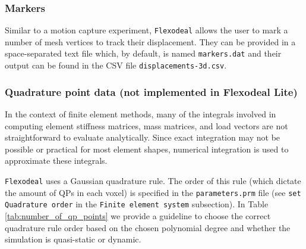 \documentclass{sfuthesis}
\numberwithin{equation}{section}
\numberwithin{figure}{chapter}
\numberwithin{table}{chapter}
\theoremstyle{definition}
\begin{document}
\subsubsection{Markers}

Similar to a motion capture experiment, \texttt{Flexodeal} allows the user to mark a number of mesh vertices to track their displacement. They can be provided in a space-separated text file which, by default, is named \texttt{markers.dat} and their output can be found in the CSV file \texttt{displacements-3d.csv}.

\subsubsection{Quadrature point data (not implemented in Flexodeal Lite)} 

In the context of finite element methods, many of the integrals involved in computing element stiffness matrices, mass matrices, and load vectors are not straightforward to evaluate analytically. Since exact integration may not be possible or practical for most element shapes, numerical integration is used to approximate these integrals.


\texttt{Flexodeal} uses a Gaussian quadrature rule. The order of this rule (which dictate the amount of QPs in each voxel) is specified in the \texttt{parameters.prm} file (see \texttt{set Quadrature order} in the \texttt{Finite element system} subsection). In Table \ref{tab:number_of_qp_points}  we provide a guideline to choose the correct quadrature rule order based on the chosen polynomial degree and whether the simulation is quasi-static or dynamic.
\end{document}
